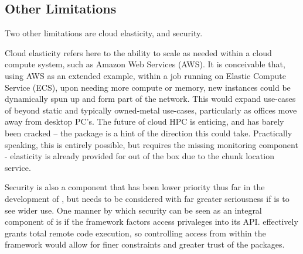 \subsection{Other Limitations}

Two other limitations are cloud elasticity, and security.

Cloud elasticity refers here to the ability to scale as needed within a cloud compute system, such as Amazon Web Services (AWS).
It is conceivable that, using AWS as an extended example, within a job running on Elastic Compute Service (ECS), upon needing more compute or memory, new instances could be dynamically spun up and form part of the network.
This would expand use-cases of \lsr{} beyond static and typically owned-metal use-cases, particularly as offices move away from desktop PC's.
The future of cloud HPC is enticing, and has barely been cracked -- the package  is a hint of the direction this could take.
Practically speaking, this is entirely possible, but requires the missing monitoring component - elasticity is already provided for out of the box due to the chunk location service.

Security is also a component that has been lower priority thus far in the development of \lsr{}, but needs to be considered with far greater seriousness if \lsr{} is to see wider use.
One manner by which security can be seen as an integral component of \lsr{} is if the framework factors access privaleges into its API.
\lsr{} effectively grants total remote code execution, so controlling access from within the framework would allow for finer constraints and greater trust of the packages.

